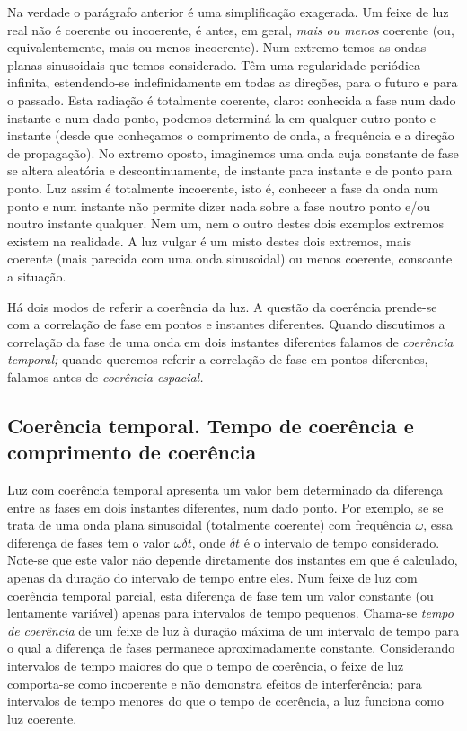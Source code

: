 Na verdade o parágrafo anterior é uma simplificação exagerada. Um feixe de luz
real não é coerente ou incoerente, é antes, em geral, \emph{mais ou menos}
coerente (ou, equivalentemente, mais ou menos incoerente). Num extremo temos as
ondas planas sinusoidais que temos considerado. Têm uma regularidade
periódica infinita, estendendo-se indefinidamente em todas as direções, para o
futuro e para o passado. Esta radiação é totalmente coerente, claro: conhecida a
fase num dado instante e num dado ponto, podemos determiná-la em qualquer outro
ponto e instante (desde que conheçamos o comprimento de onda, a frequência e a
direção de propagação). No extremo oposto, imaginemos uma onda cuja constante de
fase se altera aleatória e descontinuamente, de instante para instante e de
ponto para ponto. Luz assim é totalmente incoerente, isto é, conhecer a fase da
onda num ponto e num instante não permite dizer nada sobre a fase noutro ponto
e/ou noutro instante qualquer.  Nem um, nem o outro destes dois exemplos
extremos existem na realidade. A luz vulgar é um misto destes dois extremos,
mais coerente (mais parecida com uma onda sinusoidal) ou menos coerente,
consoante a situação.

Há dois modos de referir a coerência da luz. A questão da coerência prende-se
com a correlação de fase em pontos e instantes diferentes. Quando discutimos a
correlação da fase de uma onda em dois instantes diferentes falamos de
\emph{coerência temporal;} quando queremos referir a correlação de fase em
pontos diferentes, falamos antes de \emph{coerência espacial.}


\subsection{Coerência temporal. Tempo de coerência e comprimento de coerência}
Luz com coerência temporal apresenta um valor bem determinado da diferença entre
as fases em dois instantes diferentes, num dado ponto. Por exemplo, se se trata
de uma onda plana sinusoidal (totalmente coerente) com frequência $\omega$, essa
diferença de fases tem o valor $\omega\delta t$, onde $\delta t$ é o intervalo
de tempo considerado. Note-se que este valor não depende diretamente dos
instantes em que é calculado, apenas da duração do intervalo de tempo entre
eles. Num feixe de luz com coerência temporal parcial, esta diferença de fase
tem um valor constante (ou lentamente variável) apenas para intervalos de tempo
pequenos. Chama-se \emph{tempo de coerência} de um feixe de luz à duração máxima
de um intervalo de tempo para o qual a diferença de fases permanece
aproximadamente constante.  Considerando intervalos de tempo maiores do que o
tempo de coerência, o feixe de luz comporta-se como incoerente e não demonstra
efeitos de interferência; para intervalos de tempo menores do que o tempo de
coerência, a luz funciona como luz coerente.

